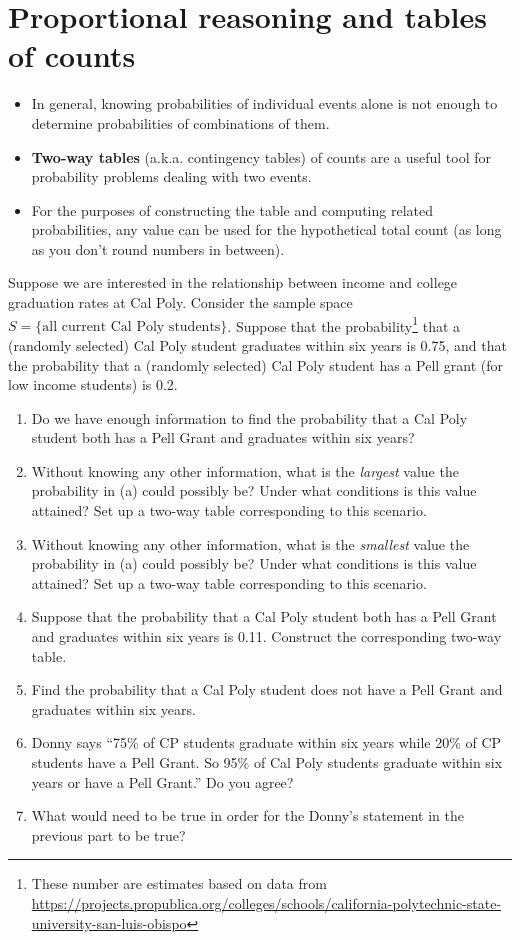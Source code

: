 \documentclass[
]{book}
\providecommand{\tightlist}{%
  \setlength{\itemsep}{0pt}\setlength{\parskip}{0pt}}
\theoremstyle{definition}
\theoremstyle{definition}
\theoremstyle{definition}
\theoremstyle{remark}
\begin{document}
\hypertarget{proportional-reasoning-and-tables-of-counts}{%
\section{Proportional reasoning and tables of counts}\label{proportional-reasoning-and-tables-of-counts}}

\begin{itemize}
\tightlist
\item
  In general, knowing probabilities of individual events alone is not enough to determine probabilities of combinations of them.
\item
  \textbf{Two-way tables} (a.k.a. contingency tables) of counts are a useful tool for probability problems dealing with two events.
\item
  For the purposes of constructing the table and computing related probabilities, any value can be used for the hypothetical total count (as long as you don't round numbers in between).
\end{itemize}

Suppose we are interested in the relationship between income and college graduation rates at Cal Poly. Consider the sample space \(S = \{\text{all current Cal Poly students}\}\).
Suppose that the probability\footnote{These number are estimates based on data from \url{https://projects.propublica.org/colleges/schools/california-polytechnic-state-university-san-luis-obispo}} that a (randomly selected) Cal Poly student graduates within six years is 0.75, and that the probability that a (randomly selected) Cal Poly student has a Pell grant (for low income students) is 0.2.

\begin{enumerate}
\def\labelenumi{\arabic{enumi}.}
\tightlist
\item
  Do we have enough information to find the probability that a Cal Poly student both has a Pell Grant and graduates within six years?
\item
  Without knowing any other information, what is the \emph{largest} value the probability in (a) could possibly be? Under what conditions is this value attained? Set up a two-way table corresponding to this scenario.
\item
  Without knowing any other information, what is the \emph{smallest} value the probability in (a) could possibly be? Under what conditions is this value attained? Set up a two-way table corresponding to this scenario.
\item
  Suppose that the probability that a Cal Poly student both has a Pell Grant and graduates within six years is 0.11. Construct the corresponding two-way table.
\item
  Find the probability that a Cal Poly student does not have a Pell Grant and graduates within six years.
\item
  Donny says ``75\% of CP students graduate within six years while 20\% of CP students have a Pell Grant. So 95\% of Cal Poly students graduate within six years or have a Pell Grant.'' Do you agree?
\item
  What would need to be true in order for the Donny's statement in the previous part to be true?
\end{enumerate}
\end{document}
